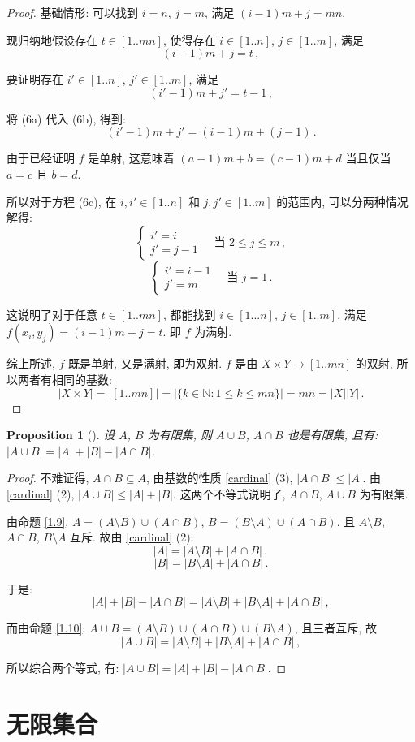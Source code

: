 \documentclass[UTF8]{ctexart}
\theoremstyle{mystyle}
\newtheorem{proposition}{Proposition}[section]
\theoremstyle{myremark}
\theoremstyle{plain}
\newcommand{\N}{\mathbb N}
\newcommand{\set}[1]{\{#1\}}
\begin{document}
\begin{proof}
    基础情形: 可以找到 $ i = n $, $ j = m $, 满足 $ (i - 1) m + j = m n $.

    现归纳地假设存在 $ t \in [1 .. mn] $, 使得存在 $ i \in [1 .. n] $, $ j \in [1 .. m] $, 满足 \[ (i - 1) m + j = t \tag{6a} \,,\] 
    
    要证明存在 $ i' \in [1 .. n] $, $ j' \in [1 .. m] $, 满足 \[ (i' - 1) m + j' = t - 1 \tag{6b} \,,\]

    将 (6a) 代入 (6b), 得到:
    \[ (i' - 1) m + j' = (i - 1) m + (j - 1) \tag{6c} \,.\]

    由于已经证明 $ f $ 是单射, 这意味着 $ (a - 1) m + b = (c - 1) m + d $ 当且仅当 $ a = c $ 且 $ b = d $. 
    
    所以对于方程 (6c), 在 $ i, i' \in [1 .. n] $ 和 $ j, j' \in [1 .. m] $ 的范围内, 可以分两种情况解得:
    \[ \begin{cases}
        i' = i \\
        j' = j - 1
    \end{cases} \quad \text{当 } 2 \leqslant j \leqslant m \,,\]
    \[ \begin{cases}
        i' = i - 1 \\
        j' = m
    \end{cases} \quad \text{当 } j = 1 \,.\]

    这说明了对于任意 $ t \in [1 .. m n] $, 都能找到 $ i \in [1 ... n] $, $ j \in [1 .. m] $, 满足 $ f(x_i, y_j) = (i - 1) m + j = t $. 即 $ f $ 为满射.

    综上所述, $ f $ 既是单射, 又是满射, 即为双射. $ f $ 是由 $ X \times Y \to [1 .. mn] $ 的双射, 所以两者有相同的基数:
    \[ |X \times Y| = |[1 .. mn]| = |\set{k \in \N \colon 1 \leqslant k \leqslant mn}| = m n = |X| |Y| \,.\]
\end{proof}


\begin{proposition}[]
    设 $ A $, $ B $ 为有限集, 则 $ A \cup B $, $ A \cap B $ 也是有限集, 且有: $ |A \cup B| = |A| + |B| - |A \cap B| $.
\end{proposition}

\begin{proof}
    不难证得, $ A \cap B \subseteq A $, 由基数的性质 \ref{cardinal} (3), $ |A \cap B| \leqslant |A| $. 由 \ref{cardinal} (2), $ |A \cup B| \leqslant |A| + |B| $. 这两个不等式说明了, $ A \cap B $, $ A \cup B $ 为有限集.

    由命题 \ref{1.9}, $ A = (A \setminus B) \cup (A \cap B) $, $ B = (B \setminus A) \cup (A \cap B) $. 且 $ A \setminus B $, $ A \cap B $, $ B \setminus A $ 互斥. 故由 \ref{cardinal} (2):
    \[ |A| = |A \setminus B| + |A \cap B| \,,\]
    \[ |B| = |B \setminus A| + |A \cap B| \,.\]

    于是:
    \[ |A| + |B| - |A \cap B| = |A \setminus B| + |B \setminus A| + |A \cap B| \,,\]

    而由命题 \ref{1.10}: $ A \cup B = (A \setminus B) \cup (A \cap B) \cup (B \setminus A) $, 且三者互斥, 故
    \[ |A \cup B| = |A \setminus B| + |B \setminus A| + |A \cap B| \,,\]

    所以综合两个等式, 有: $ |A \cup B| = |A| + |B| - |A \cap B| $.
\end{proof}




\section{无限集合}
\end{document}
